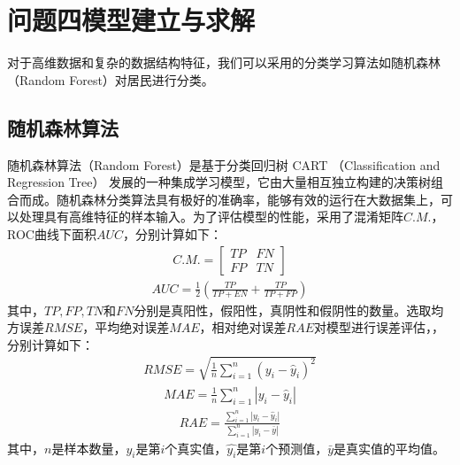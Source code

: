 \documentclass[withoutpreface,bwprint]{cumcmthesis} %
\begin{document}
\section{问题四模型建立与求解}
对于高维数据和复杂的数据结构特征，我们可以采用的分类学习算法如随机森林（Random Forest）对居民进行分类。
\subsection{随机森林算法}
随机森林算法（Random Forest）是基于分类回归树 CART （Classification and Regression Tree） 发展的一种集成学习模型，它由大量相互独立构建的决策树组合而成。随机森林分类算法具有极好的准确率，能够有效的运行在大数据集上，可以处理具有高维特征的样本输入。为了评估模型的性能，采用了混淆矩阵$C.M.$，ROC曲线下面积$AUC$，分别计算如下：
\begin{eqnarray}
C.M.=\begin{bmatrix}
  TP&FN \\
  FP&TN
\end{bmatrix}
\end{eqnarray}
\begin{eqnarray}
AUC=\frac{1}{2}(\frac{TP}{TP+EN}+\frac{TP}{TP+FP})
\end{eqnarray}
其中，$TP,FP,TN$和$FN$分别是真阳性，假阳性，真阴性和假阴性的数量。选取均方误差$RMSE$，平均绝对误差$MAE$，相对绝对误差$RAE$对模型进行误差评估，，分别计算如下：
\begin{eqnarray}
RMSE = \sqrt{\frac{1}{n} \sum_{i=1}^{n} (y_i - \hat{y}_i)^2}
\end{eqnarray}
\begin{eqnarray}
MAE = \frac{1}{n} \sum_{i=1}^{n} |y_i - \hat{y}_i|
\end{eqnarray}
\begin{eqnarray}
RAE = \frac{\sum_{i=1}^{n} |y_i - \hat{y}_i|}{\sum_{i=1}^{n} |y_i - \bar{y}|}
\end{eqnarray}
其中，$n$是样本数量，$y_i$是第$i$个真实值，$\hat{y_i}$是第$i$个预测值，$\bar{y}$是真实值的平均值。
\end{document}
